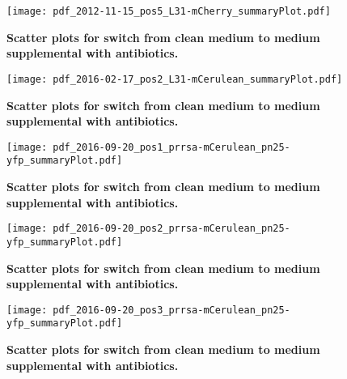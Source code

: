 \begin{figure}
    \centering    
    \texttt{[image: pdf\_2012-11-15\_pos5\_L31-mCherry\_summaryPlot.pdf]}
    \caption{ 
        \textbf{Scatter plots for switch from clean medium to medium supplemental with antibiotics.}
    }
    \label{fig:ribo:switch1}
\end{figure}
\begin{figure}
    \centering    
    \texttt{[image: pdf\_2016-02-17\_pos2\_L31-mCerulean\_summaryPlot.pdf]}
    \caption{ 
        \textbf{Scatter plots for switch from clean medium to medium supplemental with antibiotics.}
    }
    \label{fig:ribo:switch2}
\end{figure}
\begin{figure}
    \centering    
    \texttt{[image: pdf\_2016-09-20\_pos1\_prrsa-mCerulean\_pn25-yfp\_summaryPlot.pdf]}
    \caption{ 
        \textbf{Scatter plots for switch from clean medium to medium supplemental with antibiotics.}
    }
    \label{fig:ribo:switch3}
\end{figure}
\begin{figure}
    \centering    
    \texttt{[image: pdf\_2016-09-20\_pos2\_prrsa-mCerulean\_pn25-yfp\_summaryPlot.pdf]}
    \caption{ 
        \textbf{Scatter plots for switch from clean medium to medium supplemental with antibiotics.}
    }
    \label{fig:ribo:switch4}
\end{figure}
\begin{figure}
    \centering    
    \texttt{[image: pdf\_2016-09-20\_pos3\_prrsa-mCerulean\_pn25-yfp\_summaryPlot.pdf]}
    \caption{ 
        \textbf{Scatter plots for switch from clean medium to medium supplemental with antibiotics.}
    }
    \label{fig:ribo:switch5}
\end{figure}



